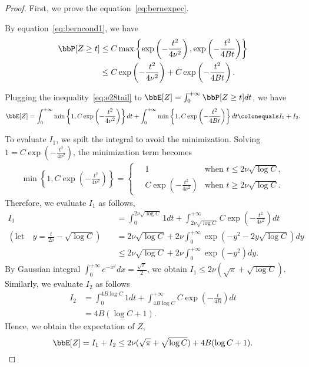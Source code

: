 \documentclass[11pt]{article}
\newcommand{\of}[1]{\left(#1\right)}
\newcommand{\offf}[1]{\left\{#1\right\}}
\theoremstyle{plain}
\theoremstyle{definition}
\begin{document}
\begin{proof}
	First, we prove the equation~\eqref{eq:bernexpec}. 
	
	\vspace{0.2cm}
	By equation~\eqref{eq:berncond1}, we have
	\begin{align}
		\bbP[Z \geq t] &\leq C \max \offf{\exp \of{-\frac{t^2}{4 \nu^2}}, \exp \of{-\frac{t^2}{4 Bt}} }\\
		&\leq C \exp \of{-\frac{t^2}{4 \nu^2}} + C \exp \of{-\frac{t^2}{4 Bt}}.\label{eq:e28tail}
	\end{align}
	
	Plugging the inequality~\eqref{eq:e28tail} to $\bbE[Z] = \int_{0}^{+\infty} \bbP[Z \geq t] dt$, we have
	\begin{equation}
		\bbE[Z] = \int_{0}^{+ \infty} \min \offf{1, C \exp \of{-\frac{t^2}{4 \nu^2}}} dt + \int_{0}^{+ \infty} \min\offf{1, C \exp \of{-\frac{t^2}{4 Bt}}} dt   \colonequals I_1 + I_2.
	\end{equation}
	
	To evaluate $I_1$, we spilt the integral to avoid the minimization. Solving $1 = C \exp \of{-\frac{t^2}{4 \nu^2}} $, the minimization term becomes
	\begin{align}
		\min \offf{1, C \exp \of{-\frac{t^2}{4 \nu^2}}} = \begin{cases}
			\quad 1 & \text{when } t \leq 2\nu \sqrt{\log C},\\
			\quad C \exp \of{-\frac{t^2}{4 \nu^2}} & \text{when } t \geq 2\nu \sqrt{\log C}.
		\end{cases}
	\end{align}
	Therefore, we evaluate $I_1$ as follows,
	\begin{align}
		I_1 &= \int_{0}^{ 2\nu \sqrt{\log C}} 1 dt + \int_{2\nu \sqrt{\log C}}^{+\infty} C \exp \of{-\frac{t^2}{4 \nu^2}} dt\\
		(\text{let}\quad y = \frac{t}{2\nu} - \sqrt{\log C})\quad &=  2\nu \sqrt{\log C} + 2\nu\int_{0}^{+\infty} \exp \of{-y^2 - 2y \sqrt{\log C}} dy\\
		&\leq  2\nu \sqrt{\log C} + 2\nu\int_{0}^{+\infty} \exp \of{-y^2} dy.
	\end{align}
	By Gaussian integral $\int_{0}^{+\infty} e^{-x^2} dx = \frac{\sqrt{\pi}}{2}$, we obtain $I_1 \leq 2\nu (\sqrt{\pi} + \sqrt{\log C})$. Similarly, we evaluate $I_2$ as follows 
	\begin{align}
		I_2 &= \int_{0}^{4B \log C} 1 dt + \int_{4B \log C}^{+\infty} C \exp \of{-\frac{t}{4B}} dt\\
		 &= 4B (\log C + 1).
	\end{align}
	Hence, we obtain the expectation of $Z$,
	\begin{equation}
		\bbE[Z] = I_1 + I_2 \leq  2\nu (\sqrt{\pi} + \sqrt{\log C}) + 4B (\log C + 1).
	\end{equation}
	

\end{proof}
\end{document}
